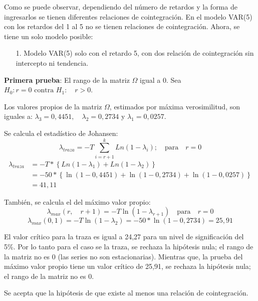 Como se puede observar, dependiendo del n\'{u}mero de retardos y la forma de ingresarlos se tienen diferentes relaciones de cointegraci\'{o}n. En el modelo VAR(5) con los retardos del 1 al 5 no se tienen relaciones de cointegraci\'{o}n. Ahora, se tiene un solo modelo posible:

\begin{enumerate}
\item[1.] Modelo VAR(5) solo con el retardo 5, con dos relaci\'{o}n de cointegraci\'{o}n sin intercepto ni tendencia.
\end{enumerate}

\textbf{Primera prueba}: El rango de la matriz $\Omega$ igual a 0. Sea $H_{0}: r=0\text{ contra } H_{1}:\quad r>0$.\newline

Los valores propios de la matriz $\Omega$, estimados por m\'{a}xima verosimilitud, son iguales a: $\lambda_{3}=0,4451,\quad \lambda_{2}=0,2734$ y $\lambda_{1}=0,0257$.\newline

Se calcula el estad\'{i}stico de Johansen: 
\[
\lambda_{traza}=-T\sum\limits_{i=r+1}^k {Ln\left( 1-\lambda_{i} \right)};\quad \text{para}\quad r=0
\]
\begin{align*}
\lambda_{traza} &= -T\ast \left\{ Ln\left( 1-\lambda_{1} \right)+Ln\left(1-\lambda_{2} \right) \right\}\\
                &= -50\ast \left\{ \ln \left( 1-0,4451 \right)+\ln \left( 1-0,2734 \right)+\ln \left( 1-0,0257 \right) \right\}\\
                &= 41,11
\end{align*}

Tambi\'{e}n, se calcula el del m\'{a}ximo valor propio:
\[
\lambda_{max}\left( r,\quad r+1 \right)=-T\ln \left( 1-\lambda_{r+1}\right)\quad \text{para}\quad r=0
\]
\[
\lambda_{max}\left( 0,1 \right)=-T\ln \left( 1-\lambda_{2} \right)=-50\ast \ln \left( 1-0,2734 \right)=25,91
\]

El valor cr\'{i}tico para la traza es igual a 24,27 para un nivel de significaci\'{o}n del 5{\%}. Por lo tanto para el caso se la traza, se rechaza la hip\'{o}tesis nula; el rango de la matriz no es 0 (las series no son estacionarias). Mientras que, la prueba del m\'{a}ximo valor propio tiene un valor cr\'{i}tico de 25,91, se rechaza la hip\'{o}tesis nula; el rango de la matriz no es 0.\newline

Se acepta que la hip\'{o}tesis de que existe al menos una relaci\'{o}n de cointegraci\'{o}n.\newline

